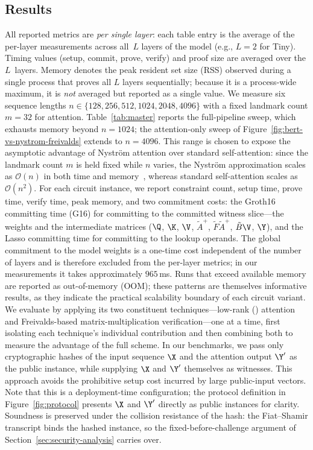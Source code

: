 \documentclass[runningheads]{llncs}
\begin{document}
\subsection{Results}
\label{subsec:pipeline-costs}
All reported metrics are \emph{per single layer}: each table entry is the average of the per-layer measurements across all~$L$ layers of the model (e.g., $L{=}2$ for Tiny). Timing values (setup, commit, prove, verify) and proof size are averaged over the $L$~layers. Memory denotes the peak resident set size (RSS) observed during a single process that proves all $L$ layers sequentially; because it is a process-wide maximum, it is \emph{not} averaged but reported as a single value. We measure six sequence lengths $n \in \{128, 256, 512, 1024, 2048, 4096\}$ with a fixed landmark count $m{=}32$ for \nystrom attention. Table~\ref{tab:master} reports the full-pipeline sweep, which exhausts memory beyond $n{=}1024$; the attention-only sweep of Figure~\ref{fig:bert-vs-nystrom-freivalds} extends to $n{=}4096$. This range is chosen to expose the asymptotic advantage of Nystr\"om attention over standard self-attention: since the landmark count $m$ is held fixed while $n$ varies, the Nystr\"om approximation scales as $\mathcal{O}(n)$ in both time and memory~\cite{Nystromformer}, whereas standard self-attention scales as $\mathcal{O}(n^2)$. For each circuit instance, we report constraint count, setup time, prove time, verify time, peak memory, and two commitment costs: the Groth16 committing time (G16) for committing to the committed witness slice---the weights and the intermediate matrices ($\Q$, $\K$, $\V$, $\tilde{A}^{+}$, $\tilde{F}\tilde{A}^{+}$, $\tilde{B}\V$, $\Y$), and the Lasso committing time for committing to the lookup operands. The global commitment to the model weights is a one-time cost independent of the number of layers and is therefore excluded from the per-layer metrics; in our measurements it takes approximately $965$\,ms. Runs that exceed available memory are reported as out-of-memory (OOM); these patterns are themselves informative results, as they indicate the practical scalability boundary of each circuit variant. We evaluate \name by applying its two constituent techniques---low-rank (\nystrom) attention and Freivalds-based matrix-multiplication verification---one at a time, first isolating each technique's individual contribution and then combining both to measure the advantage of the full scheme.
In our benchmarks, we pass only cryptographic hashes of the input sequence $\X$ and the attention output $\Y'$ as the public instance, while supplying $\X$ and $\Y'$ themselves as witnesses. This approach avoids the prohibitive setup cost incurred by large public-input vectors. Note that this is a deployment-time configuration; the protocol definition in Figure~\ref{fig:protocol} presents $\X$ and $\Y'$ directly as public instances for clarity. Soundness is preserved under the collision resistance of the hash: the Fiat--Shamir transcript binds the hashed instance, so the fixed-before-challenge argument of Section~\ref{sec:security-analysis} carries over.
\end{document}
